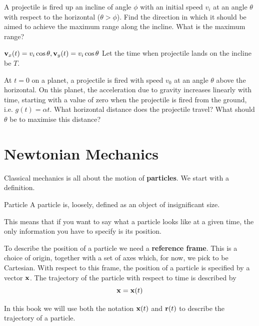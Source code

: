 \begin{exmp}{}{}
A projectile is fired up an incline of angle $\phi$ with an initial speed $v_i$ at an angle $\theta$ with respect to the horizontal ($\theta>\phi$). Find the direction in which it should be aimed to achieve the maximum range along the incline. What is the maximum range?
\end{exmp}

\begin{solution}
$\vb{v}_x(t)=v_i\cos\theta, \vb{v}_y(t)=v_i\cos\theta$
Let the time when projectile lands on the incline be $T$.

\end{solution}
\pagebreak

\begin{exmp}{}{}
At $t=0$ on a planet, a projectile is fired with speed $v_0$ at an angle $\theta$ above the horizontal. On this planet, the acceleration due to gravity increases linearly with time, starting with a value of zero when the projectile is fired from the ground, i.e. $g(t)=\alpha t$. What horizontal distance does the projectile travel? What should $\theta$ be to maximise this distance?
\end{exmp}

\chapter{Newtonian Mechanics}
Classical mechanics is all about the motion of \textbf{particles}. We start with a definition.

\begin{defn}{Particle}{}
A particle is, loosely, defined as an object of insignificant size. 

This means that if you want to say what a particle looks like at a given time, the only information you have to specify is its position.
\end{defn}

To describe the position of a particle we need a \textbf{reference frame}. This is a choice of origin, together with a set of axes which, for now, we pick to be Cartesian. With respect to this frame, the position of a particle is specified by a vector $\vb{x}$. The trajectory of the particle with respect to time is described by
\[ \vb{x}=\vb{x}(t) \]

\begin{notation}
In this book we will use both the notation $\vb{x}(t)$ and $\vb{r}(t)$ to describe the trajectory of a particle.
\end{notation}

